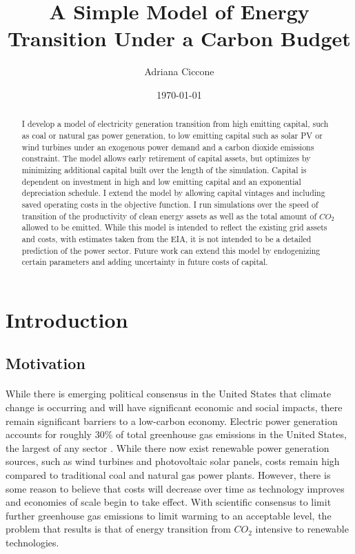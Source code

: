 \documentclass{article}
\begin{document}
\title{A Simple Model of Energy Transition Under a Carbon Budget} 
\author{Adriana Ciccone}
\date{\today}

\maketitle


\begin{abstract}
I develop a model of electricity generation transition from high emitting capital, such as coal or natural gas power generation, to low emitting capital such as solar PV or wind turbines under an exogenous power demand and a carbon dioxide emissions constraint. The model allows early retirement of capital assets, but optimizes by minimizing additional capital built over the length of the simulation. Capital is dependent on investment in high and low emitting capital and an exponential depreciation schedule. I extend the model by allowing capital vintages and including saved operating costs in the objective function. I run simulations over the speed of transition of the productivity of clean energy assets as well as the total amount of $CO_2$ allowed to be emitted. While this model is intended to reflect the existing grid assets and costs, with estimates taken from the EIA, it is not intended to be a detailed prediction of the power sector. Future work can extend this model by endogenizing certain parameters and adding uncertainty in future costs of capital.
\end{abstract}




\section{Introduction}
\subsection{Motivation}

\paragraph{} While there is emerging political consensus in the United States that climate change is occurring and will have significant economic and social impacts, there remain significant barriers to a low-carbon economy. Electric power generation accounts for roughly 30\% of total greenhouse gas emissions in the United States, the largest of any sector \cite{ElectricGHGEmit}. While there now exist renewable power generation sources, such as wind turbines and photovoltaic solar panels, costs remain high compared to traditional coal and natural gas power plants. However, there is some reason to believe that costs will decrease over time as technology improves and economies of scale begin to take effect. With scientific consensus to limit further greenhouse gas emissions to limit warming to an acceptable level, the problem that results is that of energy transition from $CO_2$ intensive to renewable technologies. 
\end{document}
